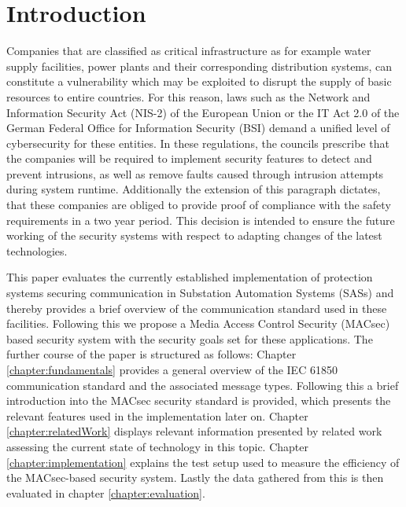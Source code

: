 \documentclass[conference]{IEEEtran}
\begin{document}
\section{Introduction}
\label{chapter:introduction}
\noindent Companies that are classified as critical infrastructure as for example water supply facilities, power plants and their corresponding 
distribution systems, can constitute a vulnerability which may be exploited to disrupt the supply of basic resources to entire countries. For this reason, 
laws such as the Network and Information Security Act (NIS-2) \cite{NIS-2:2022} of the European Union or the IT Act 2.0 \cite{IT-Gesetz_2:2021} of the 
German Federal Office for Information Security (BSI) demand a unified level of cybersecurity for these entities. In these regulations, the councils 
prescribe that the companies will be required to implement security features to detect and prevent intrusions, as well as remove faults caused through 
intrusion attempts during system runtime. \cite[§11 (1d)]{IT-Gesetz_2:2021} Additionally the extension of this paragraph dictates, that these companies 
are obliged to provide proof of compliance with the safety requirements in a two year period. \cite[§11 (1e)]{IT-Gesetz_2:2021} This decision is intended 
to ensure the future working of the security systems with respect to adapting changes of the latest technologies. 

\smallskip
This paper evaluates the currently established implementation of protection systems securing communication in Substation Automation Systems (SASs) and 
thereby provides a brief overview of the communication standard used in these facilities. Following this we propose a Media Access Control Security 
(MACsec) based security system with the security goals set for these applications. The further course of the paper is structured as follows: 
Chapter \ref{chapter:fundamentals} provides a general overview of the IEC 61850 communication standard and the associated  message types. Following this 
a brief introduction into the MACsec security standard is provided, which presents the relevant features used in the implementation later on. Chapter 
\ref{chapter:relatedWork} displays relevant information presented by related work assessing the current state of technology in this topic. Chapter 
\ref{chapter:implementation} explains the test setup used to measure the efficiency of the MACsec-based security system. Lastly the data gathered from 
this is then evaluated in chapter \ref{chapter:evaluation}. 

\end{document}
